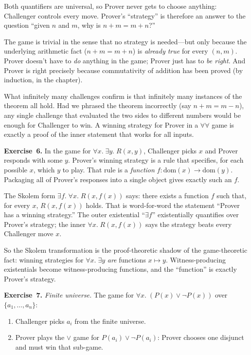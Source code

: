 \documentclass[11pt]{article}
\begin{document}
Both quantifiers are universal, so Prover never gets to choose
anything: Challenger controls every move.  Prover's ``strategy'' is
therefore an answer to the question ``given $n$ and $m$, why is
$n + m = m + n$?''

The game is trivial in the sense that no strategy is needed---but
only because the underlying arithmetic fact ($n + m = m + n$) is
\emph{already true} for every $(n, m)$.  Prover doesn't have to
\emph{do} anything in the game; Prover just has to \emph{be right}.
And Prover is right precisely because commutativity of addition has
been proved (by induction, in the chapter).

What infinitely many challenges confirm is that infinitely many
instances of the theorem all hold.  Had we phrased the theorem
incorrectly (say $n + m = m - n$), any single challenge that evaluated
the two sides to different numbers would be enough for Challenger to
win.  A winning strategy for Prover in a $\forall\forall$ game is
exactly a proof of the inner statement that works for all inputs.

\medskip
\textbf{Exercise~6.}
In the game for $\forall x.\; \exists y.\; R(x, y)$, Challenger picks
$x$ and Prover responds with some $y$.  Prover's winning strategy is
a rule that specifies, for each possible $x$, which $y$ to play.
That rule is a \emph{function} $f : \text{dom}(x) \to \text{dom}(y)$.
Packaging all of Prover's responses into a single object gives
exactly such an $f$.

The Skolem form $\exists f.\; \forall x.\; R(x, f(x))$ says: there
exists a function $f$ such that, for every $x$, $R(x, f(x))$ holds.
That is word-for-word the statement ``Prover has a winning strategy.''
The outer existential ``$\exists f$'' existentially quantifies over
Prover's strategy; the inner $\forall x.\; R(x, f(x))$ says the
strategy beats every Challenger move $x$.

So the Skolem transformation is the proof-theoretic shadow of the
game-theoretic fact: winning strategies for $\forall x.\; \exists y$
\emph{are} functions $x \mapsto y$.  Witness-producing existentials
become witness-producing functions, and the ``function'' is exactly
Prover's strategy.

\medskip
\textbf{Exercise~7.}
\emph{Finite universe.}  The game for $\forall x.\; (P(x) \vee
\lnot P(x))$ over $\{a_1, \ldots, a_n\}$:

\begin{enumerate}
  \item Challenger picks $a_i$ from the finite universe.
  \item Prover plays the $\vee$ game for $P(a_i) \vee \lnot P(a_i)$:
        Prover chooses one disjunct and must win that sub-game.
\end{enumerate}
\end{document}
